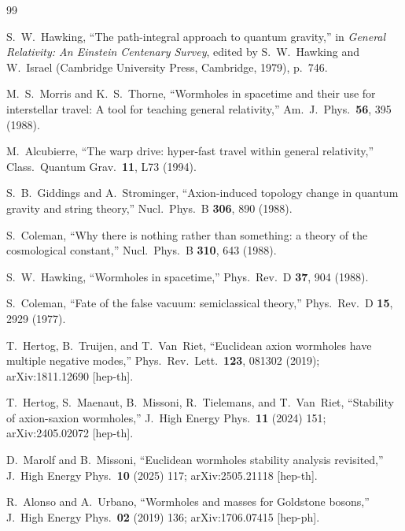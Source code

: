 \documentclass[twocolumn,floatfix,aps,prd,nofootinbib]{revtex4-2}
\begin{document}
\FloatBarrier

\begin{thebibliography}{99}

S.~W.~Hawking,
\newblock ``The path-integral approach to quantum gravity,''
\newblock in \emph{General Relativity: An Einstein Centenary Survey}, edited by S.~W.~Hawking and W.~Israel (Cambridge University Press, Cambridge, 1979), p.~746.

M.~S.~Morris and K.~S.~Thorne,
\newblock ``Wormholes in spacetime and their use for interstellar travel: A tool for teaching general relativity,''
\newblock Am.\ J.\ Phys.\ \textbf{56}, 395 (1988).

M.~Alcubierre,
\newblock ``The warp drive: hyper-fast travel within general relativity,''
\newblock Class.\ Quantum Grav.\ \textbf{11}, L73 (1994).

S.~B.~Giddings and A.~Strominger,
\newblock ``Axion-induced topology change in quantum gravity and string theory,''
\newblock Nucl.\ Phys.\ B \textbf{306}, 890 (1988).

S.~Coleman,
\newblock ``Why there is nothing rather than something: a theory of the cosmological constant,''
\newblock Nucl.\ Phys.\ B \textbf{310}, 643 (1988).

S.~W.~Hawking,
\newblock ``Wormholes in spacetime,''
\newblock Phys.\ Rev.\ D \textbf{37}, 904 (1988).

S.~Coleman,
\newblock ``Fate of the false vacuum: semiclassical theory,''
\newblock Phys.\ Rev.\ D \textbf{15}, 2929 (1977).

T.~Hertog, B.~Truijen, and T.~Van~Riet,
\newblock ``Euclidean axion wormholes have multiple negative modes,''
\newblock Phys.\ Rev.\ Lett.\ \textbf{123}, 081302 (2019); arXiv:1811.12690 [hep-th].

T.~Hertog, S.~Maenaut, B.~Missoni, R.~Tielemans, and T.~Van~Riet,
\newblock ``Stability of axion-saxion wormholes,''
\newblock J.\ High Energy Phys.\ \textbf{11} (2024) 151; arXiv:2405.02072 [hep-th].

D.~Marolf and B.~Missoni,
\newblock ``Euclidean wormholes stability analysis revisited,''
\newblock J.\ High Energy Phys.\ \textbf{10} (2025) 117; arXiv:2505.21118 [hep-th].

R.~Alonso and A.~Urbano,
\newblock ``Wormholes and masses for Goldstone bosons,''
\newblock J.\ High Energy Phys.\ \textbf{02} (2019) 136; arXiv:1706.07415 [hep-ph].


\end{thebibliography}
\end{document}
